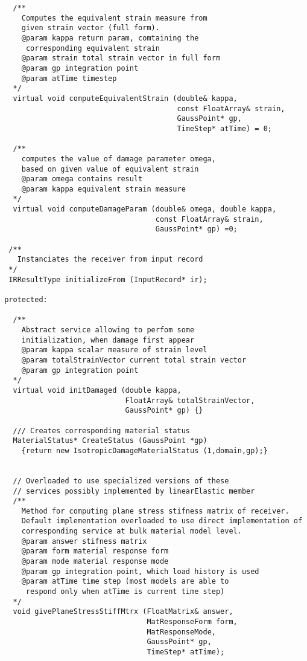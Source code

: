 \documentclass[12pt,draft]{article}
\begin{document}
{\begin{verbatim}
   /**
     Computes the equivalent strain measure from 
     given strain vector (full form).
     @param kappa return param, comtaining the 
      corresponding equivalent strain
     @param strain total strain vector in full form
     @param gp integration point
     @param atTime timestep
   */
   virtual void computeEquivalentStrain (double& kappa, 
                                         const FloatArray& strain, 
                                         GaussPoint* gp, 
                                         TimeStep* atTime) = 0;

   /**
     computes the value of damage parameter omega, 
     based on given value of equivalent strain
     @param omega contains result
     @param kappa equivalent strain measure
   */
   virtual void computeDamageParam (double& omega, double kappa, 
                                    const FloatArray& strain, 
                                    GaussPoint* gp) =0;

  /**
    Instanciates the receiver from input record
  */
  IRResultType initializeFrom (InputRecord* ir);

 protected: 

   /** 
     Abstract service allowing to perfom some 
     initialization, when damage first appear
     @param kappa scalar measure of strain level
     @param totalStrainVector current total strain vector
     @param gp integration point
   */
   virtual void initDamaged (double kappa, 
                             FloatArray& totalStrainVector, 
                             GaussPoint* gp) {}

   /// Creates corresponding material status 
   MaterialStatus* CreateStatus (GaussPoint *gp) 
     {return new IsotropicDamageMaterialStatus (1,domain,gp);}


   // Overloaded to use specialized versions of these 
   // services possibly implemented by linearElastic member
   /**
     Method for computing plane stress stifness matrix of receiver.
     Default implementation overloaded to use direct implementation of 
     corresponding service at bulk material model level.
     @param answer stifness matrix
     @param form material response form
     @param mode material response mode
     @param gp integration point, which load history is used
     @param atTime time step (most models are able to 
      respond only when atTime is current time step)
   */
   void givePlaneStressStiffMtrx (FloatMatrix& answer, 
                                  MatResponseForm form,
                                  MatResponseMode,
                                  GaussPoint* gp,
                                  TimeStep* atTime);



\end{verbatim}}
\end{document}

